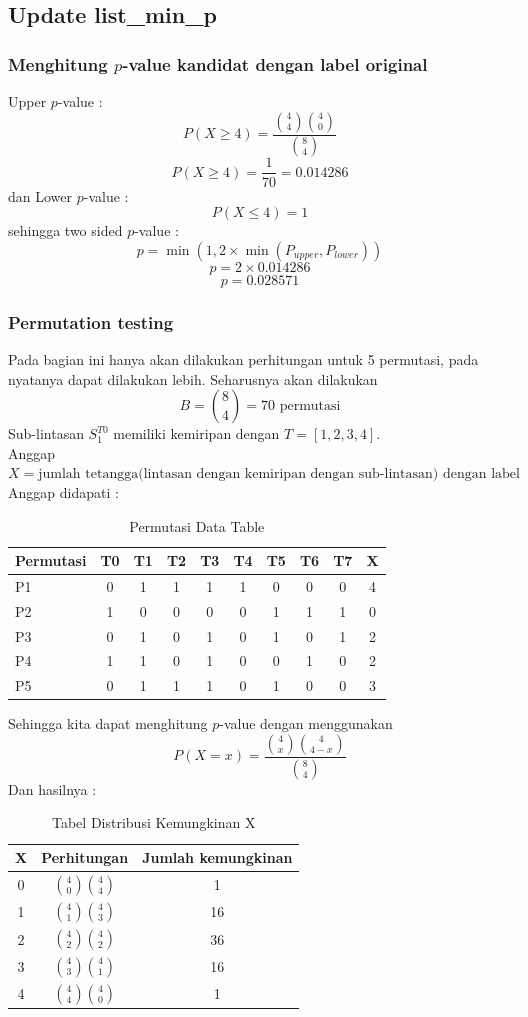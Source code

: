 \documentclass[a4paper,twoside]{article}
\begin{document}
\subsection{Update list\_min\_p}
\subsubsection{Menghitung $p$-value kandidat dengan label original}
Upper $p$-value :
\[ P(X\geq4) = \frac{\binom{4}{4}\binom{4}{0}}{\binom{8}{4}} \]
\[ P(X\geq4) = \frac{1}{70} = 0.014286 \]
dan Lower $p$-value :
\[ P(X\leq4) = 1 \]
sehingga two sided $p$-value :
\[ p = \min(1,2\times\min(P_{upper},P_{lower})) \]
\[ p = 2\times0.014286 \]
\[ p = 0.028571 \]

\subsubsection{Permutation testing}
Pada bagian ini hanya akan dilakukan perhitungan untuk 5 permutasi, pada nyatanya dapat dilakukan lebih.
Seharusnya akan dilakukan \[ B=\binom{8}{4}=70 \text{ permutasi} \]
Sub-lintasan $S_1^{T0}$ memiliki kemiripan dengan $T = [1,2,3,4]$. \\
Anggap $X = \text{jumlah tetangga(lintasan dengan kemiripan dengan sub-lintasan) dengan label positif}$
Anggap didapati :
\begin{table}[h]
\centering
\caption{Permutasi Data Table}
\label{tab:permutasi_data1}
\begin{tabular}{lccccccccc}
\hline
\textbf{Permutasi} & \textbf{T0} & \textbf{T1} & \textbf{T2} & \textbf{T3} & \textbf{T4} & \textbf{T5} & \textbf{T6} & \textbf{T7} & \textbf{X} \\ \hline
P1        & 0  & 1  & 1  & 1  & 1  & 0  & 0  & 0  & 4 \\
P2        & 1  & 0  & 0  & 0  & 0  & 1  & 1  & 1  & 0 \\
P3        & 0  & 1  & 0  & 1  & 0  & 1  & 0  & 1  & 2 \\
P4        & 1  & 1  & 0  & 1  & 0  & 0  & 1  & 0  & 2 \\
P5        & 0  & 1  & 1  & 1  & 0  & 1  & 0  & 0  & 3 \\ \hline
\end{tabular}
\end{table}

Sehingga kita dapat menghitung $p$-value dengan menggunakan \[ P(X=x)=\frac{\binom{4}{x}\binom{4}{4-x}}{\binom{8}{4}} \]
Dan hasilnya :
\begin{table}[H]
\centering
\begin{tabular}{|c|c|c|}
\hline
\textbf{X} & \textbf{Perhitungan} & \textbf{Jumlah kemungkinan} \\ \hline
0 & $\binom{4}{0}\binom{4}{4}$ & 1 \\ 
1 & $\binom{4}{1}\binom{4}{3}$ & 16 \\
2 & $\binom{4}{2}\binom{4}{2}$ & 36 \\
3 & $\binom{4}{3}\binom{4}{1}$ & 16 \\
4 & $\binom{4}{4}\binom{4}{0}$ & 1 \\ \hline
\end{tabular}
\caption{Tabel Distribusi Kemungkinan X}
\label{tab:kemungkinan_x}
\end{table}
\end{document}

